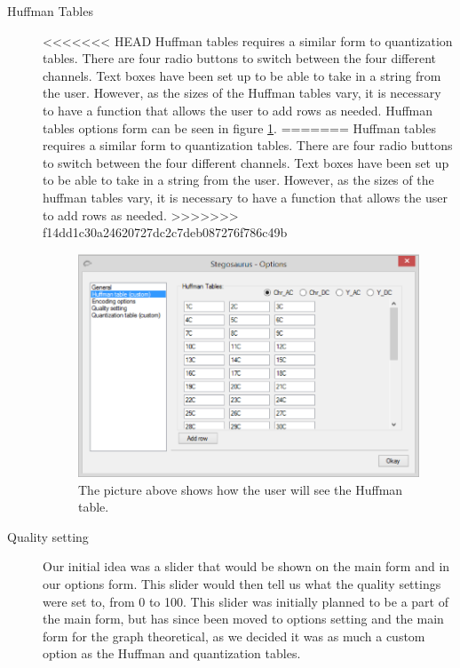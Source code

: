 \begin{description}
\item[Huffman Tables]
<<<<<<< HEAD
Huffman tables requires a similar form to quantization tables. There are four radio buttons to switch between the four different channels. Text boxes have been set up to be able to take in a string from the user. However, as the sizes of the Huffman tables vary, it is necessary to have a function that allows the user to add rows as needed. Huffman tables options form can be seen in figure \ref{fig:StegoOptionHuff}.
=======
Huffman tables requires a similar form to quantization tables.
There are four radio buttons to switch between the four different channels.
Text boxes have been set up to be able to take in a string from the user.
However, as the sizes of the huffman tables vary, it is necessary to have a function that allows the user to add rows as needed.
>>>>>>> f14dd1c30a24620727dc2c7deb087276f786c49b

\begin{figure}
	\centering
	\includegraphics[width=1\textwidth]{figures/StegoOptionHuff.png}
	\caption{The picture above shows how the user will see the Huffman table.}
	\label{fig:StegoOptionHuff}
\end{figure}

\item[Quality setting]
Our initial idea was a slider that would be shown on the main form and in our options form.
This slider would then tell us what the quality settings were set to, from 0 to 100.
This slider was initially planned to be a part of the main form, but has since been moved to options setting and the main form for the graph theoretical, as we decided it was as much a custom option as the Huffman and quantization tables.


\end{description}
